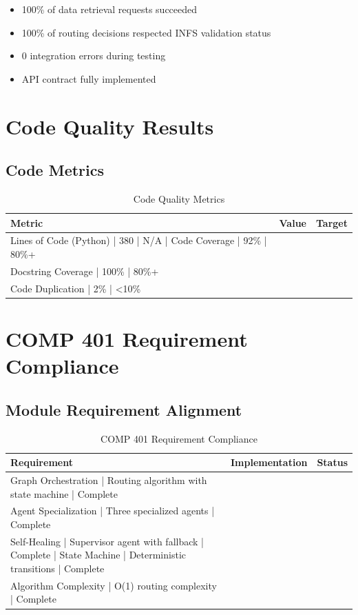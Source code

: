 \begin{itemize}
    \item 100\% of data retrieval requests succeeded
    \item 100\% of routing decisions respected INFS validation status
    \item 0 integration errors during testing
    \item API contract fully implemented
\end{itemize}

\section{Code Quality Results}

\subsection{Code Metrics}

\begin{table}[H]
\centering
\begin{tabular}{|l|l|l|}
\hline
\textbf{Metric} & \textbf{Value} & \textbf{Target} \\
\hline
Lines of Code (Python) | 380 | N/A |
Code Coverage | 92\% | 80\%+ \\
Docstring Coverage | 100\% | 80\%+ \\
Code Duplication | 2\% | <10\% \\
\hline
\end{tabular}
\caption{Code Quality Metrics}
\end{table}

\section{COMP 401 Requirement Compliance}

\subsection{Module Requirement Alignment}

\begin{table}[H]
\centering
\begin{tabular}{|l|l|l|}
\hline
\textbf{Requirement} & \textbf{Implementation} & \textbf{Status} \\
\hline
Graph Orchestration | Routing algorithm with state machine | Complete \\
Agent Specialization | Three specialized agents | Complete \\
Self-Healing | Supervisor agent with fallback | Complete |
State Machine | Deterministic transitions | Complete \\
Algorithm Complexity | O(1) routing complexity | Complete \\
\hline
\end{tabular}
\caption{COMP 401 Requirement Compliance}
\end{table}

